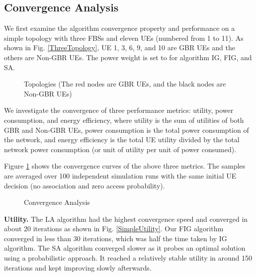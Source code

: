 \documentclass[conference]{IEEEtran}
\newcommand{\myitem}{{\setlength{\parindent}{8pt}\footnotesize{ }}}
\begin{document}
\subsection{Convergence Analysis}

We first examine the algorithm convergence property and performance on a simple topology with three FBSs and eleven UEs (numbered from 1 to 11). As shown in Fig. \ref{ThreeTopology}, UE 1, 3, 6, 9, and 10 are GBR UEs and the others are Non-GBR UEs. The power weight  is set to  for algorithm IG, FIG, and SA. 

\begin{figure}[!htbp]
\centering
{}
\caption{Topologies (The red nodes are GBR UEs, and the black nodes are Non-GBR UEs)}
\end{figure}

We investigate the convergence of three performance metrics: utility, power consumption, and energy efficiency, where utility is the sum of utilities of both GBR and Non-GBR UEs, power consumption is the total power consumption of the network, and energy efficiency is the total UE utility divided by the total network power consumption (or unit of utility per unit of power consumed).  


Figure \ref{Convergence} shows the convergence curves of the above three metrics. The samples are averaged over 100 independent simulation runs with the same initial UE decision (no association and zero access probability). 

\begin{figure}[!htbp]
\centering
{}

\caption{Convergence Analysis}
\label{Convergence}
\end{figure}

\noindent \myitem \textbf{Utility.} The LA algorithm had the highest convergence speed and converged in about 20 iterations as shown in Fig. \ref{SimpleUtility}. Our FIG algorithm converged in less than 30 iterations, which was half the time taken by IG algorithm. The SA algorithm converged slower as it probes an optimal solution using a probabilistic approach. It reached a relatively stable utility in around 150 iterations and kept improving slowly afterwards. 
\end{document}
